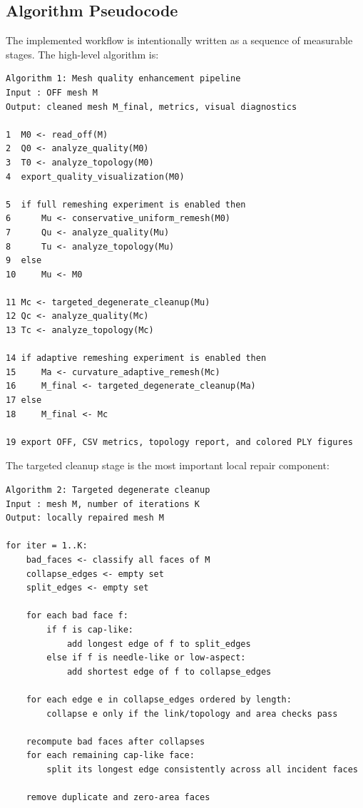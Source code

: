 \documentclass[11pt,a4paper]{article}
\begin{document}
\subsection{Algorithm Pseudocode}

The implemented workflow is intentionally written as a sequence of measurable stages. The high-level algorithm is:

\begin{verbatim}
Algorithm 1: Mesh quality enhancement pipeline
Input : OFF mesh M
Output: cleaned mesh M_final, metrics, visual diagnostics

1  M0 <- read_off(M)
2  Q0 <- analyze_quality(M0)
3  T0 <- analyze_topology(M0)
4  export_quality_visualization(M0)

5  if full remeshing experiment is enabled then
6      Mu <- conservative_uniform_remesh(M0)
7      Qu <- analyze_quality(Mu)
8      Tu <- analyze_topology(Mu)
9  else
10     Mu <- M0

11 Mc <- targeted_degenerate_cleanup(Mu)
12 Qc <- analyze_quality(Mc)
13 Tc <- analyze_topology(Mc)

14 if adaptive remeshing experiment is enabled then
15     Ma <- curvature_adaptive_remesh(Mc)
16     M_final <- targeted_degenerate_cleanup(Ma)
17 else
18     M_final <- Mc

19 export OFF, CSV metrics, topology report, and colored PLY figures
\end{verbatim}

The targeted cleanup stage is the most important local repair component:

\begin{verbatim}
Algorithm 2: Targeted degenerate cleanup
Input : mesh M, number of iterations K
Output: locally repaired mesh M

for iter = 1..K:
    bad_faces <- classify all faces of M
    collapse_edges <- empty set
    split_edges <- empty set

    for each bad face f:
        if f is cap-like:
            add longest edge of f to split_edges
        else if f is needle-like or low-aspect:
            add shortest edge of f to collapse_edges

    for each edge e in collapse_edges ordered by length:
        collapse e only if the link/topology and area checks pass

    recompute bad faces after collapses
    for each remaining cap-like face:
        split its longest edge consistently across all incident faces

    remove duplicate and zero-area faces
\end{verbatim}
\end{document}
